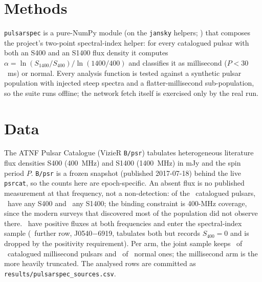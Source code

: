 \documentclass[twocolumn]{aastex631}
\newcommand{\code}[1]{\texttt{#1}}
\begin{document}
\section{Methods}
\code{pulsarspec} is a pure-NumPy module (on the \code{jansky} helpers; \citealt{jansky}) that composes
the project's two-point spectral-index helper: for every catalogued pulsar with both an S400 and an
S1400 flux density it computes $\alpha=\ln(S_{1400}/S_{400})/\ln(1400/400)$ and classifies it as
millisecond ($P<30$~ms) or normal. Every analysis function is tested against a synthetic pulsar
population with injected steep spectra and a flatter-millisecond sub-population, so the suite runs
offline; the network fetch itself is exercised only by the real run.

\section{Data}
The ATNF Pulsar Catalogue \citep{atnf} (VizieR \code{B/psr}) tabulates heterogeneous literature flux
densities S400 (400~MHz) and S1400 (1400~MHz) in mJy and the spin period $P$. \code{B/psr} is a
frozen snapshot (published 2017-07-18) behind the live \code{psrcat}, so the counts here are
epoch-specific. An absent flux is no published measurement at that frequency, not a
non-detection: of the \psrNcatalogue\ catalogued pulsars, \psrNSfourHundred\ have any S400 and \psrNSfourteenHundred\ any S1400; the binding constraint is 400-MHz coverage, since the modern
surveys that discovered most of the population did not observe there. \psrN\ have positive fluxes
at both frequencies and enter the spectral-index sample (\psrNrejected\ further row, J0540$-$6919,
tabulates both but records $S_{400}=0$ and is dropped by the positivity requirement). Per arm, the
joint sample keeps \psrNmsp\ of \psrNmspCat\ catalogued millisecond pulsars and \psrNnormal\ of \psrNnormalCat\ normal ones; the millisecond arm is the more heavily truncated. The analysed
rows are committed as \code{results/pulsarspec\_sources.csv}.
\end{document}
